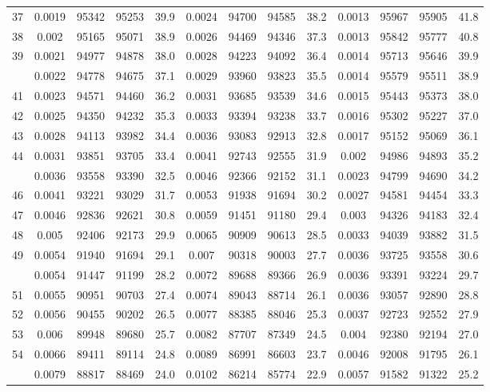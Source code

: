 \documentclass[
  14pt,
]{article}
\begin{document}
\begin{longtable}[t]{lcccccccccccc}
37 & 0.0019 & 95342 & 95253 & 39.9 & 0.0024 & 94700 & 94585 & 38.2 & 0.0013 & 95967 & 95905 & 41.8\\
38 & 0.002 & 95165 & 95071 & 38.9 & 0.0026 & 94469 & 94346 & 37.3 & 0.0013 & 95842 & 95777 & 40.8\\
39 & 0.0021 & 94977 & 94878 & 38.0 & 0.0028 & 94223 & 94092 & 36.4 & 0.0014 & 95713 & 95646 & 39.9\\
\addlinespace
40 & 0.0022 & 94778 & 94675 & 37.1 & 0.0029 & 93960 & 93823 & 35.5 & 0.0014 & 95579 & 95511 & 38.9\\
41 & 0.0023 & 94571 & 94460 & 36.2 & 0.0031 & 93685 & 93539 & 34.6 & 0.0015 & 95443 & 95373 & 38.0\\
42 & 0.0025 & 94350 & 94232 & 35.3 & 0.0033 & 93394 & 93238 & 33.7 & 0.0016 & 95302 & 95227 & 37.0\\
43 & 0.0028 & 94113 & 93982 & 34.4 & 0.0036 & 93083 & 92913 & 32.8 & 0.0017 & 95152 & 95069 & 36.1\\
44 & 0.0031 & 93851 & 93705 & 33.4 & 0.0041 & 92743 & 92555 & 31.9 & 0.002 & 94986 & 94893 & 35.2\\
\addlinespace
45 & 0.0036 & 93558 & 93390 & 32.5 & 0.0046 & 92366 & 92152 & 31.1 & 0.0023 & 94799 & 94690 & 34.2\\
46 & 0.0041 & 93221 & 93029 & 31.7 & 0.0053 & 91938 & 91694 & 30.2 & 0.0027 & 94581 & 94454 & 33.3\\
47 & 0.0046 & 92836 & 92621 & 30.8 & 0.0059 & 91451 & 91180 & 29.4 & 0.003 & 94326 & 94183 & 32.4\\
48 & 0.005 & 92406 & 92173 & 29.9 & 0.0065 & 90909 & 90613 & 28.5 & 0.0033 & 94039 & 93882 & 31.5\\
49 & 0.0054 & 91940 & 91694 & 29.1 & 0.007 & 90318 & 90003 & 27.7 & 0.0036 & 93725 & 93558 & 30.6\\
\addlinespace
50 & 0.0054 & 91447 & 91199 & 28.2 & 0.0072 & 89688 & 89366 & 26.9 & 0.0036 & 93391 & 93224 & 29.7\\
51 & 0.0055 & 90951 & 90703 & 27.4 & 0.0074 & 89043 & 88714 & 26.1 & 0.0036 & 93057 & 92890 & 28.8\\
52 & 0.0056 & 90455 & 90202 & 26.5 & 0.0077 & 88385 & 88046 & 25.3 & 0.0037 & 92723 & 92552 & 27.9\\
53 & 0.006 & 89948 & 89680 & 25.7 & 0.0082 & 87707 & 87349 & 24.5 & 0.004 & 92380 & 92194 & 27.0\\
54 & 0.0066 & 89411 & 89114 & 24.8 & 0.0089 & 86991 & 86603 & 23.7 & 0.0046 & 92008 & 91795 & 26.1\\
\addlinespace
55 & 0.0079 & 88817 & 88469 & 24.0 & 0.0102 & 86214 & 85774 & 22.9 & 0.0057 & 91582 & 91322 & 25.2\\

\end{longtable}
\end{document}
